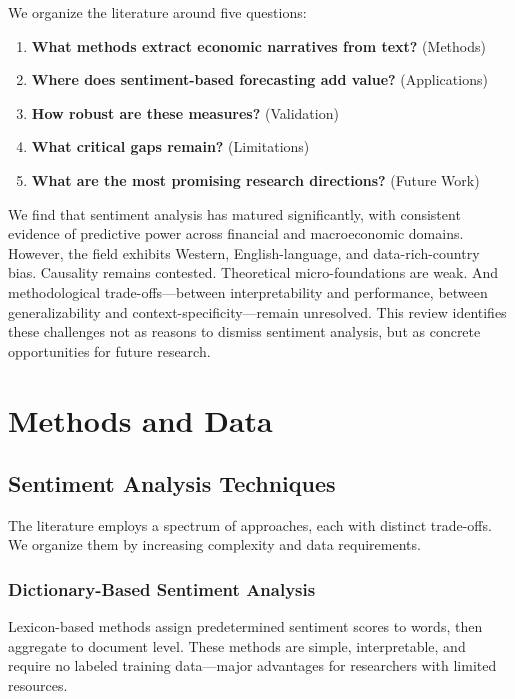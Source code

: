 \documentclass[12pt,a4paper]{article}
\begin{document}
We organize the literature around five questions:
\begin{enumerate}
\item \textbf{What methods extract economic narratives from text?} (Methods)
\item \textbf{Where does sentiment-based forecasting add value?} (Applications)
\item \textbf{How robust are these measures?} (Validation)
\item \textbf{What critical gaps remain?} (Limitations)
\item \textbf{What are the most promising research directions?} (Future Work)
\end{enumerate}

We find that sentiment analysis has matured significantly, with consistent evidence of predictive power across financial and macroeconomic domains. However, the field exhibits Western, English-language, and data-rich-country bias. Causality remains contested. Theoretical micro-foundations are weak. And methodological trade-offs—between interpretability and performance, between generalizability and context-specificity—remain unresolved. This review identifies these challenges not as reasons to dismiss sentiment analysis, but as concrete opportunities for future research.

\section{Methods and Data}
\label{sec:methods}

\subsection{Sentiment Analysis Techniques}
\label{subsec:sentiment_techniques}

The literature employs a spectrum of approaches, each with distinct trade-offs. We organize them by increasing complexity and data requirements.

\subsubsection{Dictionary-Based Sentiment Analysis}

Lexicon-based methods assign predetermined sentiment scores to words, then aggregate to document level. These methods are simple, interpretable, and require no labeled training data—major advantages for researchers with limited resources.
\end{document}
